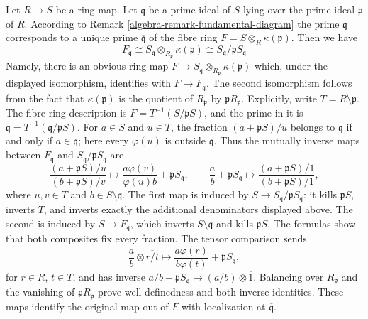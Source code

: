 \begin{remark}
\label{editorial-source-remark-local-ring-fibre}
Let $R \to S$ be a ring map. Let $\mathfrak q$ be a prime
ideal of $S$ lying over the prime ideal $\mathfrak p$ of $R$.
According to Remark \ref{algebra-remark-fundamental-diagram}
the prime $\mathfrak q$ corresponds to a unique prime
$\overline{\mathfrak q}$ of the fibre ring
$F = S \otimes_R \kappa(\mathfrak p)$.
Then we have
$$
F_{\overline{\mathfrak q}}
\cong S_\mathfrak q \otimes_{R_\mathfrak p} \kappa(\mathfrak p)
\cong S_\mathfrak q/\mathfrak p S_\mathfrak q
$$
Namely, there is an obvious ring map
$F \to S_\mathfrak q \otimes_{R_\mathfrak p} \kappa(\mathfrak p)$
which, under the displayed isomorphism, identifies with $F \to F_{\overline{\mathfrak q}}$.
The second isomorphism follows from the fact that $\kappa(\mathfrak p)$
is the quotient of $R_\mathfrak p$ by $\mathfrak pR_\mathfrak p$.
Explicitly, write $T=R\setminus\mathfrak p$. The fibre-ring
description is $F=T^{-1}(S/\mathfrak pS)$, and the prime in it is
$\overline{\mathfrak q}=T^{-1}(\mathfrak q/\mathfrak pS)$.
For $a\in S$ and $u\in T$, the fraction
$(a+\mathfrak pS)/u$ belongs to $\overline{\mathfrak q}$
if and only if $a\in\mathfrak q$; here every $\varphi(u)$
is outside $\mathfrak q$.
Thus the mutually inverse maps between $F_{\overline{\mathfrak q}}$
and $S_{\mathfrak q}/\mathfrak pS_{\mathfrak q}$ are
$$
\frac{(a+\mathfrak pS)/u}{(b+\mathfrak pS)/v}
\longmapsto
\frac{a\varphi(v)}{\varphi(u)b}+\mathfrak pS_{\mathfrak q},
\qquad
\frac{a}{b}+\mathfrak pS_{\mathfrak q}
\longmapsto
\frac{(a+\mathfrak pS)/1}{(b+\mathfrak pS)/1},
$$
where $u,v\in T$ and $b\in S\setminus\mathfrak q$.
The first map is induced by $S\to S_{\mathfrak q}/\mathfrak pS_{\mathfrak q}$:
it kills $\mathfrak pS$, inverts $T$, and inverts exactly the
additional denominators displayed above. The second is induced by
$S\to F_{\overline{\mathfrak q}}$, which inverts
$S\setminus\mathfrak q$ and kills $\mathfrak pS$.
The formulas show that both composites fix every fraction.
The tensor comparison sends
$$
\frac{a}{b}\otimes\overline{r/t}
\longmapsto
\frac{a\varphi(r)}{b\varphi(t)}+\mathfrak pS_{\mathfrak q},
$$
for $r\in R$, $t\in T$, and has inverse
$a/b+\mathfrak pS_{\mathfrak q}\mapsto(a/b)\otimes\overline{1}$.
Balancing over $R_{\mathfrak p}$ and the vanishing of
$\mathfrak pR_{\mathfrak p}$ prove well-definedness and both
inverse identities. These maps identify the original map out of
$F$ with localization at $\overline{\mathfrak q}$.
\end{remark}